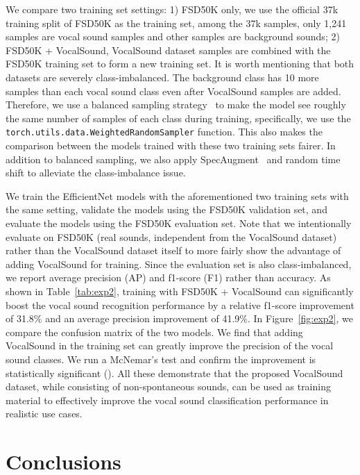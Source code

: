 \documentclass{article}
\newcommand{\squeezeup}{\vspace{-1.6mm}}
\begin{document}
We compare two training set settings: 1) FSD50K only, we use the official 37k training split of FSD50K as the training set, among the 37k samples, only 1,241 samples are vocal sound samples and other samples are background sounds; 2) FSD50K + VocalSound, VocalSound dataset samples are combined with the FSD50K training set to form a new training set. It is worth mentioning that both datasets are severely class-imbalanced. The background class has 10 more samples than each vocal sound class even after VocalSound samples are added. Therefore, we use a balanced sampling strategy~\cite{gong2021psla} to make the model see roughly the same number of samples of each class during training, specifically, we use the \texttt{torch.utils.data.WeightedRandomSampler} function. This also makes the comparison between the models trained with these two training sets fairer. In addition to balanced sampling, we also apply SpecAugment~\cite{park19e_interspeech} and random time shift to alleviate the class-imbalance issue.

We train the EfficientNet models with the aforementioned two training sets with the same setting, validate the models using the FSD50K validation set, and evaluate the models using the FSD50K evaluation set. Note that we intentionally evaluate on FSD50K (real sounds, independent from the VocalSound dataset) rather than the VocalSound dataset itself to more fairly show the advantage of adding VocalSound for training. Since the evaluation set is also class-imbalanced, we report average precision (AP) and f1-score (F1) rather than accuracy. As shown in Table~\ref{tab:exp2}, training with FSD50K + VocalSound can significantly boost the vocal sound recognition performance by a relative f1-score improvement of 31.8\% and an average precision improvement of 41.9\%. In Figure~\ref{fig:exp2}, we compare the confusion matrix of the two models. We find that adding VocalSound in the training set can greatly improve the precision of the vocal sound classes. We run a McNemar's test and confirm the improvement is statistically significant (). All these demonstrate that the proposed VocalSound dataset, while consisting of non-spontaneous sounds, can be used as training material to effectively improve the vocal sound classification performance in realistic use cases.

\squeezeup\squeezeup
\section{Conclusions}
\squeezeup
\end{document}
